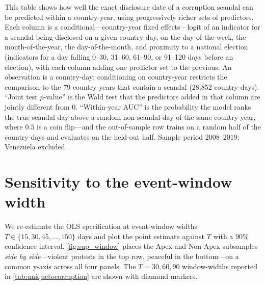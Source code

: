 \documentclass[11pt]{article}
\begin{document}
\begin{table}[htb!]
    \caption{Scandal disclosure dates are as-good-as-random}
    \label{tab:scandal_random}
    \begin{center}\end{center}
    \footnotesize{This table shows how well the exact disclosure date of a corruption scandal can be predicted within a country-year, using progressively richer sets of predictors. Each column is a conditional---country-year fixed effects---logit of an indicator for a scandal being disclosed on a given country-day, on the day-of-the-week, the month-of-the-year, the day-of-the-month, and proximity to a national election (indicators for a day falling 0--30, 31--60, 61--90, or 91--120 days before an election), with each column adding one predictor set to the previous. An observation is a country-day; conditioning on country-year restricts the comparison to the 79 country-years that contain a scandal (28{,}852 country-days). ``Joint test $p$-value'' is the Wald test that the predictors added in that column are jointly different from 0. ``Within-year AUC'' is the probability the model ranks the true scandal-day above a random non-scandal-day of the same country-year, where $0.5$ is a coin flip---and the out-of-sample row trains on a random half of the country-days and evaluates on the held-out half. Sample period 2008--2019; Venezuela excluded.}
\end{table}

\clearpage
\section{Sensitivity to the event-window width}\label{sup:window}

We re-estimate the OLS specification at event-window widths $T \in \{15, 30, 45, \dots, 150\}$ days and plot the point estimate against $T$ with a 90\% confidence interval. \autoref{fig:sup_window} places the Apex and Non-Apex subsamples \emph{side by side}---violent protests in the top row, peaceful in the bottom---on a common y-axis across all four panels. The $T=30, 60, 90$ window-widths reported in \autoref{tab:uniquetocorruption} are shown with diamond markers.
\end{document}

